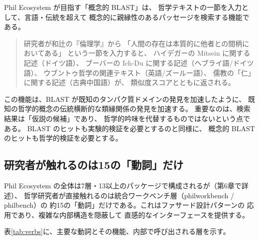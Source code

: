 \documentclass[a4paper,11pt]{ltjsarticle}
\begin{document}
Phil Ecosystem が目指す「概念的 BLAST」は、
哲学テキストの一節を入力として、言語・伝統を超えて
概念的に親縁性のあるパッセージを検索する機能である。

\begin{quote}
研究者が和辻の『倫理学』から
「人間の存在は本質的に他者との間柄においてある」
という一節を入力すると、
ハイデガーの Mitsein に関する記述（ドイツ語）、
ブーバーの Ich-Du に関する記述（ヘブライ語/ドイツ語）、
ウブントゥ哲学の関連テキスト（英語/ズールー語）、
儒教の「仁」に関する記述（古典中国語）が、
類似度スコアとともに返される。
\end{quote}

この機能は、BLAST が既知のタンパク質ドメインの発見を加速したように、
既知の哲学的概念の伝統横断的な類縁関係の発見を加速する。
重要なのは、検索結果は「仮説の候補」であり、
哲学的吟味を代替するものではないという点である。
BLAST のヒットも実験的検証を必要とするのと同様に、
概念的 BLAST のヒットも哲学的検証を必要とする。

\subsection{研究者が触れるのは15の「動詞」だけ}

Phil Ecosystem の全体は7層・13以上のパッケージで構成されるが（第6章で詳述）、
哲学研究者が直接触れるのは統合ワークベンチ層（philworkbench / philbench）の
約15の「動詞」だけである。これはファサード設計パターン\cite{gamma1995}の
応用であり、複雑な内部構造を隠蔽して
直感的なインターフェースを提供する。

表\ref{tab:verbs}に、主要な動詞とその機能、内部で呼び出される層を示す。
\end{document}
